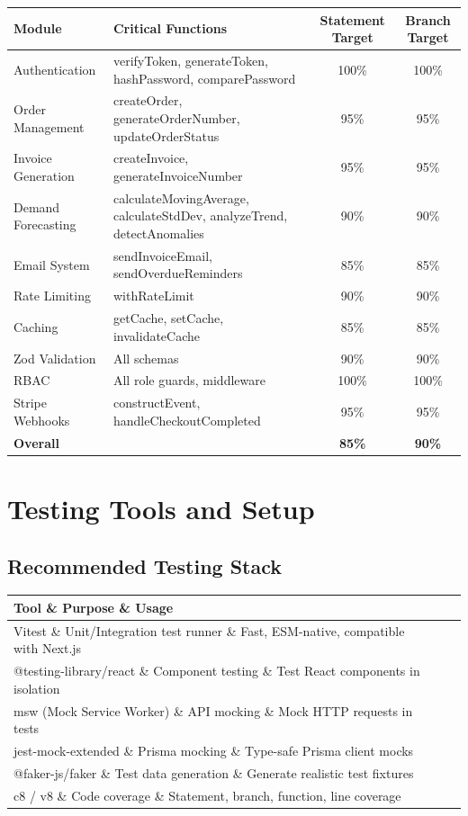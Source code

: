 \documentclass[12pt,a4paper]{report}
\begin{document}
\begin{center}
\begin{tabularx}{\textwidth}{lXcc}
  \toprule
  \textbf{Module} & \textbf{Critical Functions} & \textbf{Statement Target} & \textbf{Branch Target} \\
  \midrule
  Authentication     & verifyToken, generateToken, hashPassword, comparePassword & 100\% & 100\% \\
  Order Management   & createOrder, generateOrderNumber, updateOrderStatus & 95\%  & 95\%  \\
  Invoice Generation & createInvoice, generateInvoiceNumber & 95\%  & 95\%  \\
  Demand Forecasting & calculateMovingAverage, calculateStdDev, analyzeTrend, detectAnomalies & 90\%  & 90\%  \\
  Email System       & sendInvoiceEmail, sendOverdueReminders & 85\%  & 85\%  \\
  Rate Limiting      & withRateLimit & 90\%  & 90\%  \\
  Caching            & getCache, setCache, invalidateCache & 85\%  & 85\%  \\
  Zod Validation     & All schemas & 90\%  & 90\%  \\
  RBAC               & All role guards, middleware & 100\% & 100\% \\
  Stripe Webhooks    & constructEvent, handleCheckoutCompleted & 95\%  & 95\%  \\
  \midrule
  \textbf{Overall}   & & \textbf{85\%} & \textbf{90\%} \\
  \bottomrule
\end{tabularx}
\end{center}

\section{Testing Tools and Setup}
\subsection{Recommended Testing Stack}
\begin{center}
\begin{tabularx}{\textwidth}{llX}
  \toprule
  \textbf{Tool} \& \textbf{Purpose} \& \textbf{Usage} \\
  \midrule
  Vitest \& Unit/Integration test runner \& Fast, ESM-native, compatible with Next.js \\
  @testing-library/react \& Component testing \& Test React components in isolation \\
  msw (Mock Service Worker) \& API mocking \& Mock HTTP requests in tests \\
  jest-mock-extended \& Prisma mocking \& Type-safe Prisma client mocks \\
  @faker-js/faker \& Test data generation \& Generate realistic test fixtures \\
  c8 / v8 \& Code coverage \& Statement, branch, function, line coverage \\
  \bottomrule
\end{tabularx}
\end{center}
\end{document}
